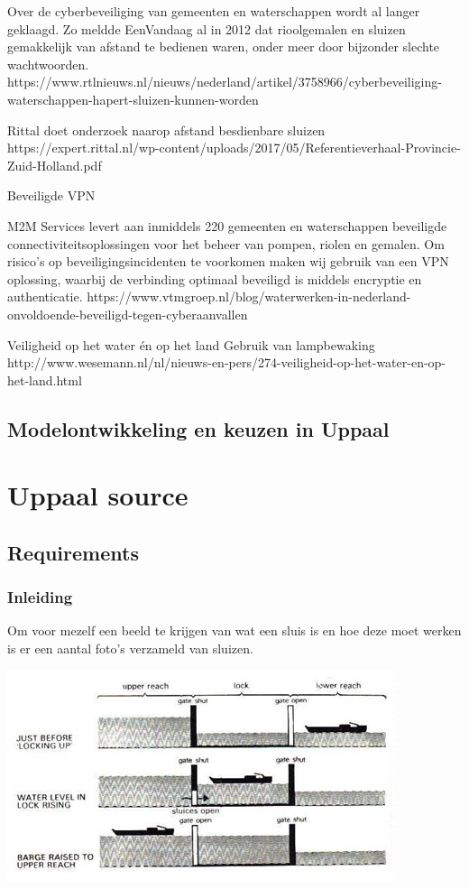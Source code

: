 Over de cyberbeveiliging van gemeenten en waterschappen wordt al langer geklaagd. Zo meldde EenVandaag al in 2012 dat rioolgemalen en sluizen gemakkelijk van afstand te bedienen waren, onder meer door bijzonder slechte wachtwoorden.
https://www.rtlnieuws.nl/nieuws/nederland/artikel/3758966/cyberbeveiliging-waterschappen-hapert-sluizen-kunnen-worden

Rittal doet onderzoek naarop afstand besdienbare sluizen
https://expert.rittal.nl/wp-content/uploads/2017/05/Referentieverhaal-Provincie-Zuid-Holland.pdf



Beveiligde VPN

M2M Services levert aan inmiddels 220 gemeenten en waterschappen beveiligde connectiviteitsoplossingen voor het beheer van pompen, riolen en gemalen. Om risico’s op beveiligingsincidenten te voorkomen maken wij gebruik van een VPN oplossing, waarbij de verbinding optimaal beveiligd is middels encryptie en authenticatie.
https://www.vtmgroep.nl/blog/waterwerken-in-nederland-onvoldoende-beveiligd-tegen-cyberaanvallen

Veiligheid op het water én op het land
Gebruik van lampbewaking 
http://www.wesemann.nl/nl/nieuws-en-pers/274-veiligheid-op-het-water-en-op-het-land.html



\newpage
\section{Modelontwikkeling en keuzen in Uppaal}
\chapter{Uppaal source}
\label{appendix}
\thispagestyle{myheadings}

	\section{Requirements}
\subsection{Inleiding}
Om voor mezelf een beeld te krijgen van wat een sluis is en hoe deze moet werken is er een aantal foto's verzameld van sluizen.	
	
	\includegraphics[scale=0.65]{sluismodel.jpg}
	
